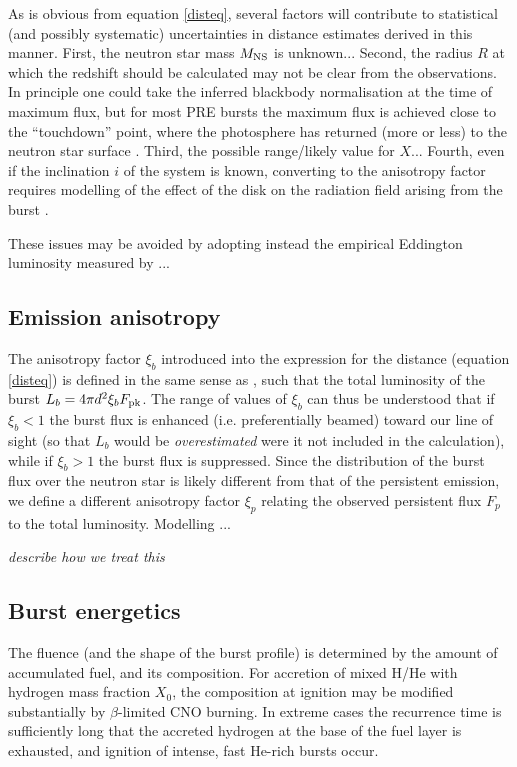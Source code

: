 \documentclass{aastex63}
\begin{document}
As is obvious from equation \ref{disteq}, several factors will contribute to statistical (and possibly systematic) uncertainties in distance estimates derived in this manner. First, the neutron star mass $M_{\rm NS}$ is unknown...
%
Second, the radius $R$ at which the redshift should be calculated may not be clear from the observations. In principle one could take the inferred blackbody normalisation at the time of maximum flux, but for most PRE bursts the maximum flux is achieved close to the ``touchdown'' point, where the photosphere has returned (more or less) to the neutron star surface \cite[e.g.][]{gal06a}.
%
Third, the possible range/likely value for $X$...
%
Fourth, even if the inclination $i$ of the system is known, converting to the anisotropy factor requires modelling of the effect of the disk on the radiation field arising from the burst \cite[e.g.][]{he16}.

These issues may be avoided by adopting instead the empirical Eddington luminosity measured by \cite[]{kuul03a}...

\subsection{Emission anisotropy}
\label{subsec:anisotropy}

The anisotropy factor $\xi_b$ introduced into the expression for the distance (equation  \ref{disteq}) is defined in the same sense as \citep{fuji88}, such that the total luminosity of the burst $L_b=4\pi d^2\xi_b F_{\rm pk}$. The range of values of $\xi_b$ can thus be understood that if $\xi_b<1$ the burst flux is enhanced (i.e. preferentially beamed) toward our line of sight (so that $L_b$ would be {\it overestimated} were it not included in the calculation), while if $\xi_b>1$ the burst flux is suppressed.
%
Since the distribution of the burst flux over the neutron star is likely different from that of the persistent emission, we define a different anisotropy factor $\xi_p$ relating the observed persistent flux $F_p$ to the total luminosity. Modelling \cite[]{he16}...

{\it describe how we treat this }

\subsection{Burst energetics}
\label{subsec:energetics}

The fluence (and the shape of the burst profile) is determined by the amount of accumulated fuel, and its composition. For accretion of mixed H/He with hydrogen mass fraction $X_0$, the composition at ignition may be modified substantially by $\beta$-limited CNO burning. In extreme cases the recurrence time is sufficiently long that the accreted hydrogen at the base of the fuel layer is exhausted, and ignition of intense, fast He-rich bursts occur.
\end{document}

